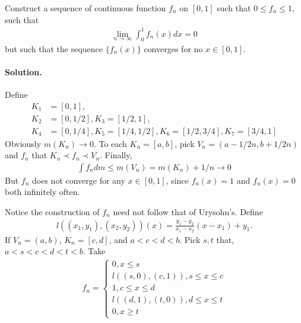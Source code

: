 \documentclass[../main.tex]{subfiles}
\begin{document}
 \begin{exercise}
   Construct a sequence of continuous function $ f_n $ on $ [0, 1] $ such that $ 0 \le f_n \le 1 $, such that
   \begin{align*}
     \lim _{n \to \infty} \int_0^1 f_n(x) dx = 0
   \end{align*}
   but such that the sequence $ \{f_n(x)\} $ converges for no $ x \in [0, 1] $.

   \paragraph{Solution. }
   Define
   \begin{align*}
     K_1 &= [0, 1], \\
     K_2 &= [0, 1/2], K_3 = [1/2, 1], \\
     K_4 &= [0, 1/4], K_5 = [1/4, 1/2], K_6 = [1/2, 3/4], K_7 = [3/4, 1]
   \end{align*}
   Obviously $ m(K_n) \to 0 $. To each $ K_n = [a, b] $, pick $ V_n = (a - 1/2n, b + 1/2n) $ and $ f_n $ that $ K_n \prec f_n \prec V_n $. Finally,
   \begin{align*}
     \int f_n dm \le m(V_n) = m(K_n) + 1/n \to 0
   \end{align*}
   But $ f_n $ does not converge for any $ x \in [0, 1] $, since $ f_n(x) = 1 $ and $ f_n(x) = 0 $ both infinitely often.

   Notice the construction of $ f_n $ need not follow that of Urysohn's. Define
   \begin{align*}
     l((x_1, y_1), (x_2, y_2))(x) = \frac {y_1 - y_2}{x_1 - x_2} (x - x_1) + y_1.
   \end{align*}
   If $ V_n = (a, b) $, $ K_n = [c, d] $, and $ a < c < d < b $. Pick $ s, t $ that, $ a < s < c < d < t < b $. Take
   \begin{align*}
     f_n = \begin{cases}
       0, x \le s\\
       l((s, 0), (c, 1)), s \le x \le c\\
       1, c \le x \le d\\
       l((d, 1), (t, 0)), d \le x \le t\\
       0, x \ge t
   \end{cases}
   \end{align*}

 \end{exercise}
 
\end{document}
